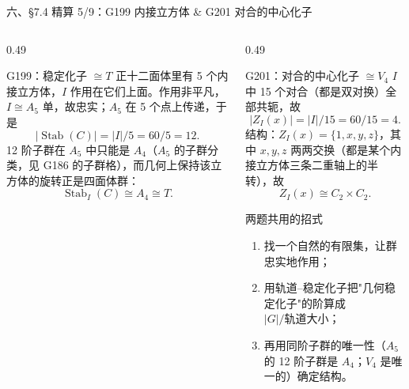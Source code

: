 \documentclass[aspectratio=169,10pt,fontset=none]{ctexbeamer}
\begin{document}
\begin{frame}[t]{六、\S7.4 精算 5/9：G199 内接立方体 \& G201 对合的中心化子}
  \begin{columns}[T,onlytextwidth]
    \begin{column}{0.49\textwidth}
      \begin{block}{\footnotesize G199：稳定化子 $\cong T$}
        \scriptsize
        正十二面体里有 5 个内接立方体，$I$ 作用在它们上面。作用非平凡，$I\cong A_5$ 单，故忠实；$A_5$ 在 5 个点上传递，于是
        \[ |\operatorname{Stab}(C)|=|I|/5=60/5=12. \]
        12 阶子群在 $A_5$ 中只能是 $A_4$（$A_5$ 的子群分类，见 G186 的子群格），而几何上保持该立方体的旋转正是四面体群：
        \[ \operatorname{Stab}_I(C)\cong A_4\cong T. \]
      \end{block}
    \end{column}
    \begin{column}{0.49\textwidth}
      \begin{block}{\footnotesize G201：对合的中心化子 $\cong V_4$}
        \scriptsize
        $I$ 中 15 个对合（都是双对换）全部共轭，故
        \[ |Z_I(x)|=|I|/15=60/15=4. \]
        结构：$Z_I(x)=\{1,x,y,z\}$，其中 $x,y,z$ 两两交换（都是某个内接立方体三条二重轴上的半转），故
        \[ Z_I(x)\cong C_2\times C_2. \]
      \end{block}
      \begin{alertblock}{\footnotesize 两题共用的招式}
        \scriptsize
        \begin{enumerate}\setlength{\itemsep}{0pt}
          \item 找一个自然的有限集，让群忠实地作用；
          \item 用轨道--稳定化子把"几何稳定化子"的阶算成 $|G|/\text{轨道大小}$；
          \item 再用同阶子群的唯一性（$A_5$ 的 12 阶子群是 $A_4$；$V_4$ 是唯一的）确定结构。
        \end{enumerate}
      \end{alertblock}
    \end{column}
  \end{columns}
\end{frame}
\end{document}
